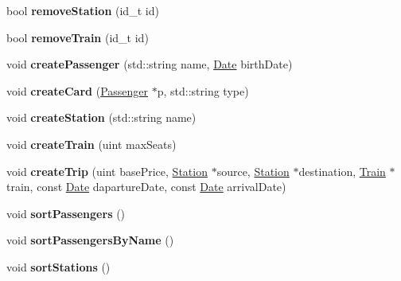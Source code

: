 \begin{DoxyCompactItemize}
\mbox{\label{classSystem_ae582dd1c79cbd879ba1fbec5ceaab2fb}} 
bool {\bfseries remove\+Station} (id\+\_\+t id)
\item 
\mbox{\label{classSystem_acf1d845cdb88b43143b3f738214e866b}} 
bool {\bfseries remove\+Train} (id\+\_\+t id)
\item 
\mbox{\label{classSystem_a623d7369872a9af9b69b24bd2a3c71b1}} 
void {\bfseries create\+Passenger} (std\+::string name, \mbox{\hyperlink{classDate}{Date}} birth\+Date)
\item 
\mbox{\label{classSystem_a9e317da5b607c6dee850089f340dd9e7}} 
void {\bfseries create\+Card} (\mbox{\hyperlink{classPassenger}{Passenger}} $\ast$p, std\+::string type)
\item 
\mbox{\label{classSystem_ab8cf1529f497af79b72fe6cc59b08d60}} 
void {\bfseries create\+Station} (std\+::string name)
\item 
\mbox{\label{classSystem_aa4cf09119e31e5bdf9d9187a7a60cd1a}} 
void {\bfseries create\+Train} (uint max\+Seats)
\item 
\mbox{\label{classSystem_aea8519bf009400085f8e499891b7eb37}} 
void {\bfseries create\+Trip} (uint base\+Price, \mbox{\hyperlink{classStation}{Station}} $\ast$source, \mbox{\hyperlink{classStation}{Station}} $\ast$destination, \mbox{\hyperlink{classTrain}{Train}} $\ast$train, const \mbox{\hyperlink{classDate}{Date}} daparture\+Date, const \mbox{\hyperlink{classDate}{Date}} arrival\+Date)
\item 
\mbox{\label{classSystem_a360f9d625dbc649d567249642c1db53c}} 
void {\bfseries sort\+Passengers} ()
\item 
\mbox{\label{classSystem_ae3b7301dda5863379777c863df0b976e}} 
void {\bfseries sort\+Passengers\+By\+Name} ()
\item 
\mbox{\label{classSystem_a94f061c2fa79b7f0e4f175fc68a59246}} 
void {\bfseries sort\+Stations} ()
\item 
\mbox{\label{classSystem_a3961bbb1e8a309ef37c4366731bbb813}} 

\end{DoxyCompactItemize}

